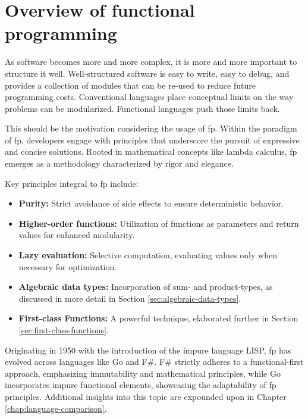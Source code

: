     \chapter{Overview of functional programming}\label{chap:functional-programming}
    \begin{shaded}
        \noindent
        \glqq{}As software becomes more and more complex, it is more and more important to structure it well. Well-structured software is easy to write, easy to debug, and provides a collection of modules that can be re-used to reduce future programming costs. Conventional languages place conceptual limits on the way problems can be modularized. Functional languages push those limits back.\grqq{} \cite{Hughes1989}
    \end{shaded}
    This should be the motivation considering the usage of \ac{fp}.
    Within the paradigm of \ac{fp}, developers engage with principles that underscore the pursuit of expressive and concise solutions. Rooted in mathematical concepts like lambda calculus, \ac{fp} emerges as a methodology characterized by rigor and elegance.
    
    Key principles integral to \ac{fp} include:
    
    \begin{itemize}
        \item \textbf{Purity:} Strict avoidance of side effects to ensure deterministic behavior.
        \item \textbf{Higher-order functions:} Utilization of functions as parameters and return values for enhanced modularity.
        \item \textbf{Lazy evaluation:} Selective computation, evaluating values only when necessary for optimization.
        \item \textbf{Algebraic data types:} Incorporation of sum- and product-types, as discussed in more detail in Section \ref{sec:algebraic-data-types}.
        \item \textbf{First-class Functions:} A powerful technique, elaborated further in Section \ref{sec:first-class-functions}.
    \end{itemize}
    
    Originating in 1950 with the introduction of the impure language LISP, \ac{fp} has evolved across languages like Go and F\#. F\# strictly adheres to a functional-first approach, emphasizing immutability and mathematical principles, while Go incorporates impure functional elements, showcasing the adaptability of \ac{fp} principles. Additional insights into this topic are expounded upon in Chapter \ref{chap:language-comparison}.
    
